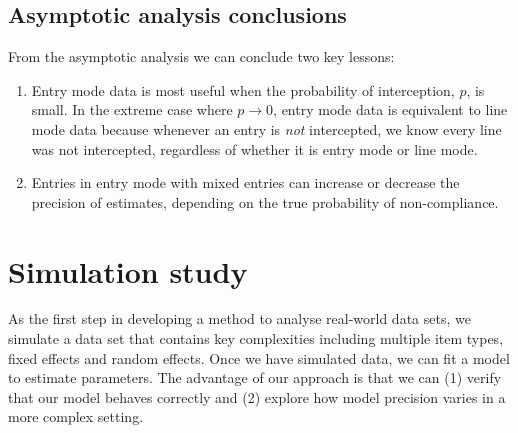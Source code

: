 \documentclass{article}
\begin{document}
%
%
%
%


\subsection{Asymptotic analysis conclusions}

From the asymptotic analysis we can conclude two key lessons:
\begin{enumerate}
\item Entry mode data is most useful when the probability of interception, \(p\), is small. In the extreme case where \(p\rightarrow 0\), entry mode data is equivalent to line mode data because whenever an entry is \emph{not} intercepted, we know every line was not intercepted, regardless of whether it is entry mode or line mode. 
\item Entries in entry mode with mixed entries can increase or decrease the precision of estimates, depending on the true probability of non-compliance. 
\end{enumerate}


\section{Simulation study}
As the first step in developing a method to analyse real-world data sets, we simulate a data set that contains key complexities including multiple item types, fixed effects and random effects. Once we have simulated data, we can fit a model to estimate parameters. The advantage of our approach is that we can (1) verify that our model behaves correctly and (2) explore how model precision varies in a more complex setting.
\end{document}
